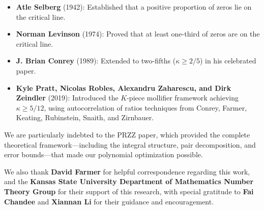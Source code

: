 \documentclass[11pt]{article}
\begin{document}
\begin{itemize}
\item \textbf{Atle Selberg} (1942): Established that a positive proportion of zeros lie on the critical line.
\item \textbf{Norman Levinson} (1974): Proved that at least one-third of zeros are on the critical line.
\item \textbf{J. Brian Conrey} (1989): Extended to two-fifths ($\kappa \geq 2/5$) in his celebrated paper.
\item \textbf{Kyle Pratt, Nicolas Robles, Alexandru Zaharescu, and Dirk Zeindler} (2019): Introduced the $K$-piece mollifier framework achieving $\kappa \geq 5/12$, using autocorrelation of ratios techniques from Conrey, Farmer, Keating, Rubinstein, Snaith, and Zirnbauer.
\end{itemize}

We are particularly indebted to the PRZZ paper, which provided the complete theoretical framework---including the integral structure, pair decomposition, and error bounds---that made our polynomial optimization possible.

We also thank \textbf{David Farmer} for helpful correspondence regarding this work, and the \textbf{Kansas State University Department of Mathematics Number Theory Group} for their support of this research, with special gratitude to \textbf{Fai Chandee} and \textbf{Xiannan Li} for their guidance and encouragement.
\end{document}
